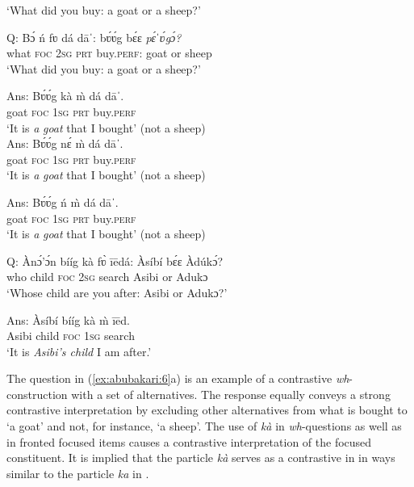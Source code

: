 \documentclass[output=paper,modfonts,nonflat,
 hidelinks
]{langsci/langscibook}
\begin{document}
\glt ‘What did you buy: a goat or a sheep?’ 

\ex \label{ex:abubakari:6c}
Q: \gll *Bɔ́  ń  fʋ  dá  dāˈ:    bʋ́ʋ́g  bɛ́ɛ \textit{pɛ́ˈʋ́gɔ́?}\\
what  \textsc{foc}  2\textsc{sg}  \textsc{prt}  buy.\textsc{perf}:  goat  or sheep \\
\glt ‘What did you buy: a goat or a sheep?’ 

\ex \label{ex:abubakari:6d}
Ans: \gll  Bʋ́ʋ́g  kà  m̀  dá  dāˈ.\\
goat  \textsc{foc}  1\textsc{sg}  \textsc{prt}  buy.\textsc{perf}\\
\glt ‘It is \textit{a} \textit{goat} that I bought’ (not a sheep)\\

\ex \label{ex:abubakari:6e}
Ans: \gll *Bʋ́ʋ́g  nɛ́  m̀  dá  dāˈ.\\
 goat  \textsc{foc}  1\textsc{sg}  \textsc{prt}  buy.\textsc{perf}\\
\glt ‘It is \textit{a} \textit{goat} that I bought’ (not a sheep)

\ex\label{ex:abubakari:6f}
Ans: \gll *Bʋ́ʋ́g  ń  m̀  dá  dāˈ. \\
goat  \textsc{foc}  1\textsc{sg}  \textsc{prt}  buy.\textsc{perf}\\
\glt ‘It is \textit{a} \textit{goat} that I bought’ (not a sheep)\\
\z
\z
 

\ea\label{ex:abubakari:7}
\ea\label{ex:abubakari:7a}
Q: \gll Ànɔ́'ɔ́n  bííg  kà  fʋ̀  ī\={e}dá:  Àsíbí  bɛ́ɛ  Àdúkɔ́?      \\
who  child  \textsc{foc}  2\textsc{sg}  search  Asibi  or  Adukɔ         \\
\glt ‘Whose child are you after: Asibi or Adukɔ?’                         

\ex\label{ex:abubakari:7b}
Ans: \gll Àsíbí  bííg  kà  \`{m}  ī\={e}d.\\
Asibi  child  \textsc{foc}  1\textsc{sg}  search\\
\glt ‘It is \textit{Asibi’s child} I am after.'
\z
\z 

The question in (\ref{ex:abubakari:6}a) is an example of a contrastive \textit{wh}{}- construction with a set of alternatives. The response equally conveys a strong contrastive  interpretation by excluding other alternatives from what is bought to ‘a goat’ and not, for instance, ‘a sheep’. The use of \textit{kà} in \textit{wh}{}-questions as well as in fronted focused items causes a contrastive  interpretation of the focused constituent. It is implied that the particle \textit{kà} serves as a contrastive  in  in ways similar to the particle \textit{ka} in  \citep{hudu2012}. 
\end{document}
